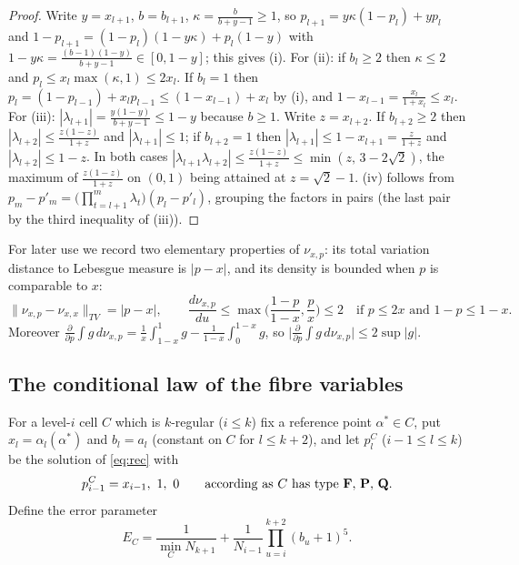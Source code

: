 \documentclass[11pt]{amsart}
\theoremstyle{definition}
\numberwithin{equation}{section}
\begin{document}
\begin{proof}
Write $y=x_{l+1}$, $b=b_{l+1}$, $\kappa=\frac b{b+y-1}\ge1$, so $p_{l+1}=y\kappa(1-p_l)+yp_l$ and
$1-p_{l+1}=(1-p_l)(1-y\kappa)+p_l(1-y)$ with $1-y\kappa=\frac{(b-1)(1-y)}{b+y-1}\in[0,1-y]$; this gives (i).
For (ii): if $b_l\ge2$ then $\kappa\le2$ and $p_l\le x_l\max(\kappa,1)\le2x_l$. If $b_l=1$ then $p_l=(1-p_{l-1})+x_lp_{l-1}\le(1-x_{l-1})+x_l$
by (i), and $1-x_{l-1}=\frac{x_l}{1+x_l}\le x_l$.
For (iii): $|\lambda_{l+1}|=\frac{y(1-y)}{b+y-1}\le1-y$ because $b\ge1$. Write $z=x_{l+2}$. If $b_{l+2}\ge2$ then
$|\lambda_{l+2}|\le\frac{z(1-z)}{1+z}$ and $|\lambda_{l+1}|\le1$; if $b_{l+2}=1$ then $|\lambda_{l+1}|\le1-x_{l+1}=\frac{z}{1+z}$ and $|\lambda_{l+2}|\le1-z$.
In both cases $|\lambda_{l+1}\lambda_{l+2}|\le\frac{z(1-z)}{1+z}\le\min(z,\,3-2\sqrt2)$, the maximum of $\frac{z(1-z)}{1+z}$ on $(0,1)$ being attained
at $z=\sqrt2-1$.
(iv) follows from $p_m-p'_m=\big(\prod_{t=l+1}^m\lambda_t\big)(p_l-p'_l)$, grouping the factors in pairs (the last pair by the third
inequality of (iii)).
\end{proof}

For later use we record two elementary properties of $\nu_{x,p}$: its total variation distance to Lebesgue measure is $|p-x|$, and
its density is bounded when $p$ is comparable to $x$:
\begin{equation}\label{eq:nudens}
\|\nu_{x,p}-\nu_{x,x}\|_{TV}=|p-x|,\qquad \frac{d\nu_{x,p}}{du}\le\max\Big(\frac{1-p}{1-x},\frac px\Big)\le2\quad\text{if }p\le 2x\text{ and }1-p\le1-x .
\end{equation}
Moreover $\frac{\partial}{\partial p}\int g\,d\nu_{x,p}=\frac1x\int_{1-x}^1g-\frac1{1-x}\int_0^{1-x}g$, so $\big|\frac{\partial}{\partial p}\int g\,d\nu_{x,p}\big|\le2\sup|g|$.

\subsection*{The conditional law of the fibre variables}
For a level-$i$ cell $C$ which is $k$-regular ($i\le k$) fix a reference point $\alpha^*\in C$, put $x_l=\alpha_l(\alpha^*)$ and
$b_l=a_l$ (constant on $C$ for $l\le k+2$), and let $p^C_l$ ($i-1\le l\le k$) be the solution of \eqref{eq:rec} with
\[
p^C_{i-1}=x_{i-1},\ 1,\ 0\qquad\text{according as $C$ has type \textbf F, \textbf P, \textbf Q}.
\]
Define the error parameter
\begin{equation}\label{eq:EC}
E_C=\frac1{\min_CN_{k+1}}+\frac{1}{N_{i-1}}\prod_{u=i}^{k+2}(b_u+1)^5 .
\end{equation}
\end{document}

